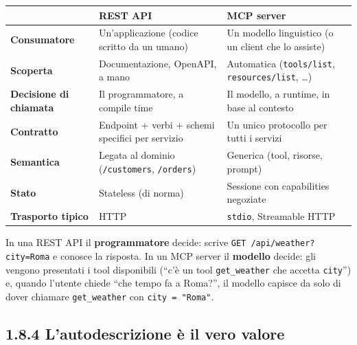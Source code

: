 \documentclass[
  italian,
  10pt,
]{book}
\newcounter{none} %
\begin{document}
{\def\LTcaptype{none} %
\begin{longtable}[]{@{}
  >{\raggedright\arraybackslash}p{}
  >{\raggedright\arraybackslash}p{}
  >{\raggedright\arraybackslash}p{}@{}}
\toprule\noalign{}
\begin{minipage}[b]{\linewidth}\raggedright
\end{minipage} & \begin{minipage}[b]{\linewidth}\raggedright
REST API
\end{minipage} & \begin{minipage}[b]{\linewidth}\raggedright
MCP server
\end{minipage} \\
\midrule\noalign{}
\endhead
\bottomrule\noalign{}
\endlastfoot
\textbf{Consumatore} & Un'applicazione (codice scritto da un umano) & Un
modello linguistico (o un client che lo assiste) \\
\textbf{Scoperta} & Documentazione, OpenAPI, a mano & Automatica
(\texttt{tools/list}, \texttt{resources/list}, \ldots) \\
\textbf{Decisione di chiamata} & Il programmatore, a compile time & Il
modello, a runtime, in base al contesto \\
\textbf{Contratto} & Endpoint + verbi + schemi specifici per servizio &
Un unico protocollo per tutti i servizi \\
\textbf{Semantica} & Legata al dominio (\texttt{/customers},
\texttt{/orders}) & Generica (tool, risorse, prompt) \\
\textbf{Stato} & Stateless (di norma) & Sessione con capabilities
negoziate \\
\textbf{Trasporto tipico} & HTTP & \texttt{stdio}, Streamable HTTP \\
\end{longtable}
}

\normalsize

In una REST API il \textbf{programmatore} decide: scrive
\texttt{GET\ /api/weather?city=Roma} e conosce la risposta. In un MCP
server il \textbf{modello} decide: gli vengono presentati i tool
disponibili (``c'è un tool \texttt{get\_weather} che accetta
\texttt{city}'') e, quando l'utente chiede ``che tempo fa a Roma?'', il
modello capisce da solo di dover chiamare \texttt{get\_weather} con
\texttt{city\ =\ "Roma"}.

\subsection{1.8.4 L'autodescrizione è il vero
valore}\label{lautodescrizione-uxe8-il-vero-valore}
\end{document}
